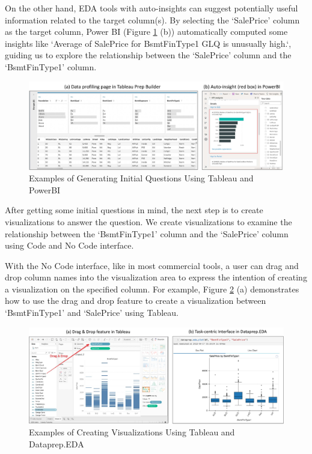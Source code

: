\documentclass[11pt]{article}
\newcommand{\stitle}[1]{ \noindent{\bf #1.\xspace}}
\begin{document}
On the other hand, EDA tools with auto-insights can suggest potentially useful information related to the target column(s). By selecting the `SalePrice' column as the target column, Power BI (Figure \ref{fig:profiling-and-auto-insight} (b)) automatically computed some insights like `Average of SalePrice for BsmtFinType1 GLQ is unusually high.`, guiding us to explore the relationship between the `SalePrice' column and the `BsmtFinType1' column.

\begin{figure}[tb]
\centering
\includegraphics[width=1.0\textwidth]{figs/profiling-and-auto-insight.pdf}
\caption{Examples of Generating Initial Questions Using Tableau and PowerBI}
\label{fig:profiling-and-auto-insight}
\end{figure}


\stitle{Create Visualizations}
After getting some initial questions in mind, the next step is to create visualizations to answer the question. We create visualizations to examine the relationship between the `BsmtFinType1' column and the `SalePrice' column using Code and No Code interface. 

With the No Code interface, like in most commercial tools, a user can drag and drop column names into the visualization area to express the intention of creating a visualization on the specified column. For example, Figure \ref{fig:drag-drop-task-centric} (a) demonstrates how to use the drag and drop feature to create a visualization between `BsmtFinType1' and `SalePrice' using Tableau.

\begin{figure}[h]
\centering
\includegraphics[width=\textwidth]{figs/drag-drop-task-centric.pdf}
\caption{Examples of Creating Visualizations Using Tableau and Dataprep.EDA}
\label{fig:drag-drop-task-centric}
\end{figure}
\end{document}

